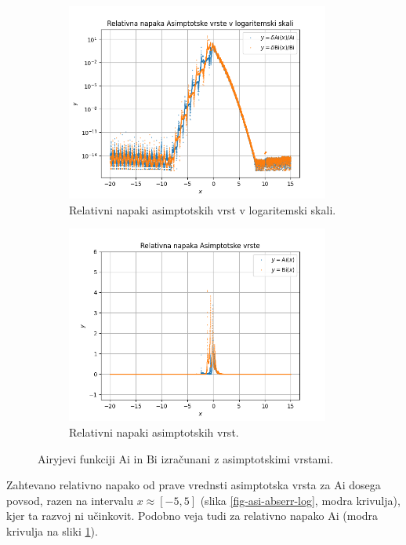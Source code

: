 \documentclass[a4paper, 12pt, slovene]{article}
\newcommand{\Ai}{\mathrm{Ai}}
\newcommand{\Bi}{\mathrm{Bi}}
\begin{document}
\begin{figure}[H]
\begin{subfigure}{0.49\textwidth}
	\includegraphics[width=0.95\textwidth]{grafi/asimptotska_rel_err.png}
	\caption{Relativni napaki asimptotskih vrst v logaritemski skali.}
	\label{fig-asi-relerr-log}
\end{subfigure}
\begin{subfigure}{0.49\textwidth}
	\centering
	\includegraphics[width=0.95\textwidth]{grafi/asimptotska_rel_err_noscale.png}
	\caption{Relativni napaki asimptotskih vrst.}
	\label{fig-asi-relerr}
\end{subfigure}

\caption{Airyjevi funkciji $\Ai$ in $\Bi$ izračunani z asimptotskimi vrstami.}
\label{fig-asimptotske}
\end{figure}

Zahtevano relativno napako od prave vrednsti asimptotska vrsta za $\Ai$ dosega povsod, razen na intervalu $x\approx[-5, 5]$ (slika \ref{fig-asi-abserr-log}, modra krivulja), kjer ta razvoj ni učinkovit. Podobno veja tudi za relativno napako $\Ai$ (modra krivulja na sliki \ref{fig-asi-relerr-log}). \par\vspace{5mm}
\end{document}
